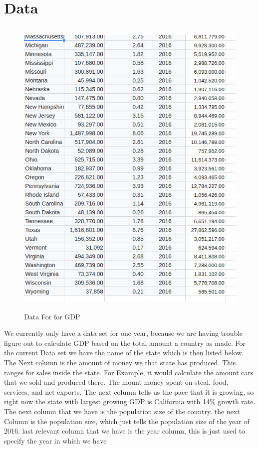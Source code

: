 \documentclass{article}
\begin{document}
\section{Data}
\begin{figure}[ht!]
\includegraphics[width=15cm, height=15cm]{Data.png}
\caption{ Data For for GDP  }
\end{figure}
               



We currently only have a data set for one year, because we are having trouble figure out to calculate GDP based on the total amount a country as made. For the current Data  set we have the name of the state which is then listed below. The Next column is the amount of money we that state has produced. This ranges for sales inside the state. For Example, it would calculate the amount cars that we sold and produced there. The mount money spent on steal, food, services, and net exports. The next column tells us the pace that it is growing, so right now the state with largest growing GDP is California with 14\% growth rate. The next column that we have is the population size of the country. the next Column is the population size, which just tells the population size of the year of 2016. last relevant column that we have is the year column, this is just used to specify the year in which we have  
\end{document}
